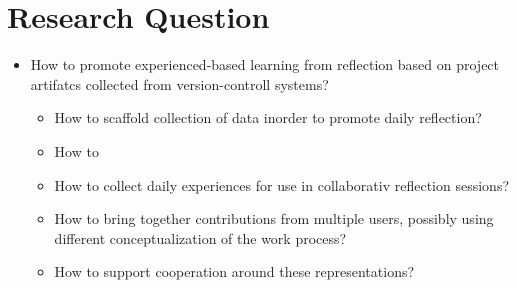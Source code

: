 \section{Research Question}

\begin{itemize}
	\item How to promote experienced-based learning from reflection based on project artifatcs collected from version-controll systems?
	\begin{itemize}
		\item How to scaffold collection of data inorder to promote daily reflection?
		\item How to 
		\item How to collect daily experiences for use in collaborativ reflection sessions?
		\item How to bring together contributions from multiple users, possibly using different conceptualization of the work process? 
		\item How to support cooperation around these representations?
	\end{itemize}
\end{itemize}